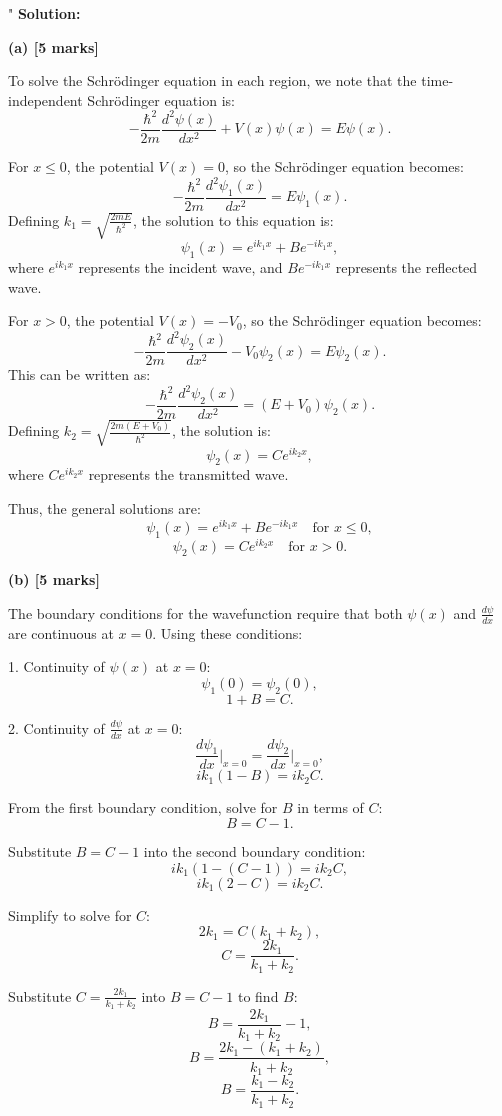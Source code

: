 "
\textbf{Solution:}

\textbf{(a) [5 marks]}

To solve the Schrödinger equation in each region, we note that the time-independent Schrödinger equation is:
\[
-\frac{\hbar^2}{2m} \frac{d^2 \psi(x)}{dx^2} + V(x) \psi(x) = E \psi(x).
\]

For $x \leq 0$, the potential $V(x) = 0$, so the Schrödinger equation becomes:
\[
-\frac{\hbar^2}{2m} \frac{d^2 \psi_1(x)}{dx^2} = E \psi_1(x).
\]
Defining $k_1 = \sqrt{\frac{2mE}{\hbar^2}}$, the solution to this equation is:
\[
\psi_1(x) = e^{ik_1x} + Be^{-ik_1x},
\]
where $e^{ik_1x}$ represents the incident wave, and $Be^{-ik_1x}$ represents the reflected wave.

For $x > 0$, the potential $V(x) = -V_0$, so the Schrödinger equation becomes:
\[
-\frac{\hbar^2}{2m} \frac{d^2 \psi_2(x)}{dx^2} - V_0 \psi_2(x) = E \psi_2(x).
\]
This can be written as:
\[
-\frac{\hbar^2}{2m} \frac{d^2 \psi_2(x)}{dx^2} = (E + V_0) \psi_2(x).
\]
Defining $k_2 = \sqrt{\frac{2m(E + V_0)}{\hbar^2}}$, the solution is:
\[
\psi_2(x) = Ce^{ik_2x},
\]
where $Ce^{ik_2x}$ represents the transmitted wave.

Thus, the general solutions are:
\[
\psi_1(x) = e^{ik_1x} + Be^{-ik_1x} \quad \text{for } x \leq 0,
\]
\[
\psi_2(x) = Ce^{ik_2x} \quad \text{for } x > 0.
\]

\textbf{(b) [5 marks]}

The boundary conditions for the wavefunction require that both $\psi(x)$ and $\frac{d\psi}{dx}$ are continuous at $x = 0$. Using these conditions:

1. Continuity of $\psi(x)$ at $x = 0$:
\[
\psi_1(0) = \psi_2(0),
\]
\[
1 + B = C.
\]

2. Continuity of $\frac{d\psi}{dx}$ at $x = 0$:
\[
\frac{d\psi_1}{dx}\bigg|_{x=0} = \frac{d\psi_2}{dx}\bigg|_{x=0},
\]
\[
ik_1(1 - B) = ik_2C.
\]

From the first boundary condition, solve for $B$ in terms of $C$:
\[
B = C - 1.
\]

Substitute $B = C - 1$ into the second boundary condition:
\[
ik_1(1 - (C - 1)) = ik_2C,
\]
\[
ik_1(2 - C) = ik_2C.
\]

Simplify to solve for $C$:
\[
2k_1 = C(k_1 + k_2),
\]
\[
C = \frac{2k_1}{k_1 + k_2}.
\]

Substitute $C = \frac{2k_1}{k_1 + k_2}$ into $B = C - 1$ to find $B$:
\[
B = \frac{2k_1}{k_1 + k_2} - 1,
\]
\[
B = \frac{2k_1 - (k_1 + k_2)}{k_1 + k_2},
\]
\[
B = \frac{k_1 - k_2}{k_1 + k_2}.
\]

